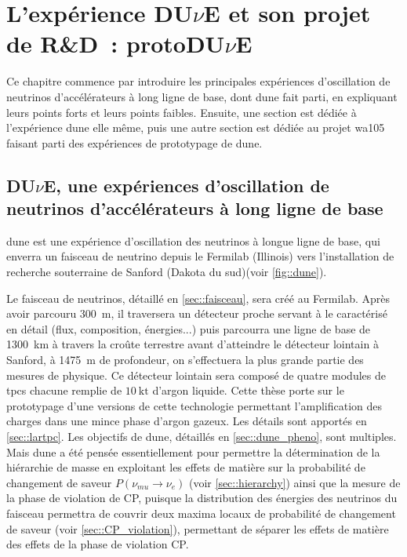\chapter{L'expérience \texorpdfstring{DU$\nu$E}{DUNE} et son projet de R\&D~: \texorpdfstring{protoDU$\nu$E}{protoDUNE}}
    
    Ce chapitre commence par introduire les principales expériences d'oscillation de neutrinos d'accélérateurs à long ligne de base, dont \gls{dune} fait parti, en expliquant leurs points forts et leurs points faibles. Ensuite, une section est dédiée à l'expérience \gls{dune} elle même, puis une autre section est dédiée au projet \gls{wa105} faisant parti des expériences de prototypage de \gls{dune}.
        
    \section{DU$\nu$E, une expériences d'oscillation de neutrinos d'accélérateurs à long ligne de base}
    
        \gls{dune} est une expérience d'oscillation des neutrinos à longue ligne de base, qui enverra un faisceau de neutrino depuis le Fermilab (Illinois) vers l'installation de recherche souterraine de Sanford (Dakota du sud)(voir \autoref{fig::dune}). 
        
        Le faisceau de neutrinos, détaillé en \autoref{sec::faisceau}, sera créé au Fermilab. Après avoir parcouru \SI{300}{\meter}, il traversera un détecteur proche servant à le caractérisé en détail (flux, composition, énergies...) puis parcourra une ligne de base de \SI{1300}{\kilo\meter} à travers la croûte terrestre avant d'atteindre le détecteur lointain à Sanford, à \SI{1475}{\meter} de profondeur, on s'effectuera la plus grande partie des mesures de physique. Ce détecteur lointain sera composé de quatre modules de \glspl{tpc} chacune remplie de $\SI{10}{\kilo\tonne}$ d'argon liquide. Cette thèse porte sur le prototypage d'une versions de cette technologie permettant l'amplification des charges dans une mince phase d'argon gazeux. Les détails sont apportés en \autoref{sec::lartpc}. Les objectifs de \gls{dune}, détaillés en \autoref{sec::dune_pheno}, sont multiples. Mais \gls{dune} a été pensée essentiellement pour permettre la détermination de la hiérarchie de masse en exploitant les effets de matière sur la probabilité de changement de saveur $P(\nu_{mu} \to \nu_e)$ (voir \autoref{sec::hierarchy}) ainsi que la mesure de la phase de violation de CP, puisque la distribution des énergies des neutrinos du faisceau permettra de couvrir deux maxima locaux de probabilité de changement de saveur (voir \autoref{sec::CP_violation}), permettant de séparer les effets de matière des effets de la phase de violation CP. 
        
